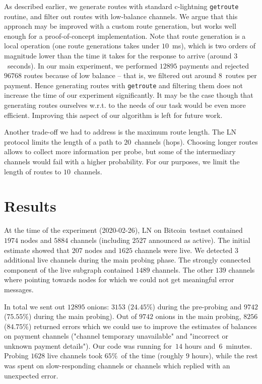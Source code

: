 As described earlier, we generate routes with standard c-lightning \texttt{getroute} routine, and filter out routes with low-balance channels.
We argue that this approach may be improved with a custom route generation, but works well enough for a proof-of-concept implementation.
Note that route generation is a local operation (one route generations takes under $10$~ms), which is two orders of magnitude lower than the time it takes for the response to arrive (around $3$~seconds).
In our main experiment, we performed $12895$ payments and rejected $96768$ routes because of low balance -- that is, we filtered out around 8~routes per payment.
Hence generating routes with \texttt{getroute} and filtering them does not increase the time of our experiment significantly.
It may be the case though that generating routes ourselves w.r.t. to the needs of our task would be even more efficient.
Improving this aspect of our algorithm is left for future work.

Another trade-off we had to address is the maximum route length.
The LN protocol limits the length of a path to $20$~channels (hops).
Choosing longer routes allows to collect more information per probe, but some of the intermediary channels would fail with a higher probability.
For our purposes, we limit the length of routes to $10$~channels.




\section{Results} \label{sec:results}

At the time of the experiment (2020-02-26), LN on Bitcoin~testnet contained $1974$ nodes and $5884$ channels (including $2527$ announced as active).
The initial estimate showed that $207$ nodes and $1625$ channels were live.
We detected $3$ additional live channels during the main probing phase.
The strongly connected component of the live subgraph contained $1489$ channels.
The other $139$ channels where pointing towards nodes for which we could not get meaningful error messages.

In total we sent out $12895$ onions: $3153$ ($24.45\%$) during the pre-probing and $9742$ ($75.55\%$) during the main probing).
Out of $9742$ onions in the main probing, $8256$ ($84.75\%$) returned errors which we could use to improve the estimates of balances on payment channels ("channel temporary unavailable" and "incorrect or unknown payment details").
Our code was running for~$14$ hours and~$6$~minutes. %
Probing $1628$ live channels took $65\%$~of the time (roughly $9$ hours), while the rest was spent on slow-responding channels or channels which replied with an unexpected error.


